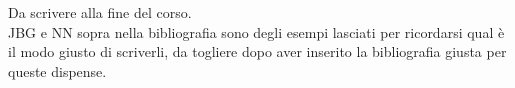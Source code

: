 Da scrivere alla fine del corso. \\
JBG e NN sopra nella bibliografia sono degli esempi lasciati per ricordarsi qual è il modo giusto di scriverli, da togliere dopo aver inserito la bibliografia giusta per queste dispense.
